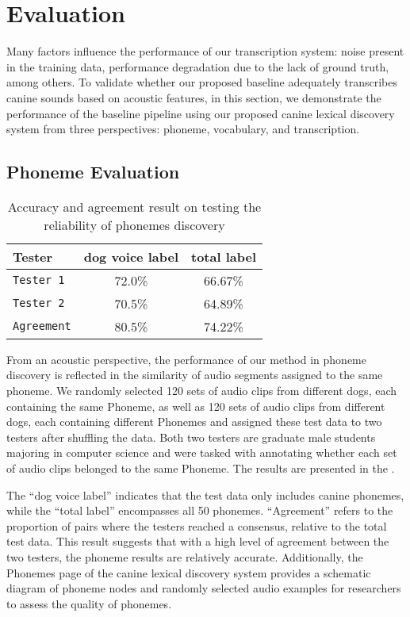\section{Evaluation}


Many factors influence the performance of our transcription system: noise present in the training data, performance degradation due to the lack of ground truth, among others. To validate whether our proposed baseline adequately transcribes canine sounds based on acoustic features, in this section, we demonstrate the performance of the baseline pipeline using our proposed canine lexical discovery system from three perspectives: phoneme, vocabulary, and transcription.



\subsection{Phoneme Evaluation}


\begin{table}[th]
\centering
\small
\begin{tabular}{lcc}
\hline
\textbf{Tester} & \textbf{dog voice label} & \textbf{total label}\\
\hline
\verb|Tester 1| & 72.0\% & 66.67\% \\
\verb|Tester 2| & 70.5\% & 64.89\% \\
\verb|Agreement| & 80.5\% & 74.22\% \\\hline
\end{tabular}
\caption{Accuracy and agreement result on testing the reliability of phonemes discovery}
\label{tab:phonetestresult}
\end{table}

From an acoustic perspective, the performance of our method in phoneme discovery is reflected in the similarity of audio segments assigned to the same phoneme. We randomly selected 120 sets of audio clips from different dogs, each containing the same Phoneme, as well as 120 sets of audio clips from different dogs, each containing different Phonemes and assigned these test data to two testers after shuffling the data. Both two testers are graduate male students majoring in computer science and were tasked with annotating whether each set of audio clips belonged to the same Phoneme. The results are presented in the .

The ``dog voice label'' indicates that the test data only includes canine phonemes, while the ``total label'' encompasses all 50 phonemes. ``Agreement'' refers to the proportion of pairs where the testers reached a consensus, relative to the total test data. This result suggests that with a high level of agreement between the two testers, the phoneme results are relatively accurate. Additionally, the Phonemes page of the canine lexical discovery system provides a schematic diagram of phoneme nodes and randomly selected audio examples for researchers to assess the quality of phonemes.

